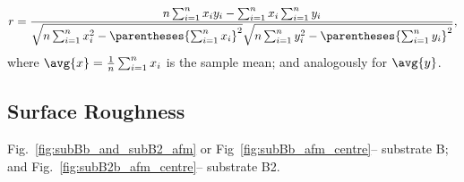 \begin{equation}\label{eq:pearson_correlation_coefficient}
    r = \frac{
        n\sum_{i=1}^nx_iy_i - \sum_{i=1}^n x_i \sum_{i=1}^n y_i
        }{
        \sqrt{n\sum_{i=1}^n x_i^2 - \parentheses{\sum_{i=1}^n x_i}^2}\sqrt{n\sum_{i=1}^n y_i^2 - \parentheses{\sum_{i=1}^n y_i}^2} },
\end{equation}
where $\avg{x}=\frac{1}{n}\sum_{i=1}^n x_i$ is the sample mean; and analogously for $\avg{y}$. 

%


\subsection{Surface Roughness}
Fig.~\ref{fig:subBb_and_subB2_afm} or Fig~\ref{fig:subBb_afm_centre}-- substrate B; and Fig.~\ref{fig:subB2b_afm_centre}-- substrate B2.

